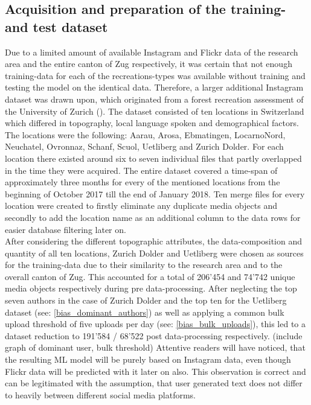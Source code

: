 \subsection{Acquisition and preparation of the training- and test dataset} \label{preparation_training_data}
Due to a limited amount of available Instagram and Flickr data of the research area and the entire canton of Zug respectively, it was certain that not enough training-data for each of the recreations-types was available without training and testing the model on the identical data. Therefore, a larger additional Instagram dataset was drawn upon, which originated from a forest recreation assessment of the University of Zurich (\parencite{forest recreation assessment}). The dataset consisted of ten locations in Switzerland which differed in topography, local language spoken and demographical factors. The locations were the following: Aarau, Arosa, Ebmatingen, LocarnoNord, Neuchatel, Ovronnaz, Schanf, Scuol, Uetliberg and Zurich Dolder. For each location there existed around six to seven individual files that partly overlapped in the time they were acquired. The entire dataset covered a time-span of approximately three months for every of the mentioned locations from the beginning of October 2017 till the end of January 2018.
Ten merge files for every location were created to firstly eliminate any duplicate media objects and secondly to add the location name as an additional column to the data rows for easier database filtering later on.\\
\newline
After considering the different topographic attributes, the data-composition and quantity of all ten locations, Zurich Dolder and Uetliberg were chosen as sources for the training-data due to their similarity to the research area and to the overall canton of Zug. This accounted for a total of 206'454 and 74'742 unique media objects respectively during pre data-processing. After neglecting the top seven authors in the case of Zurich Dolder and the top ten for the Uetliberg dataset (see: \ref{bias_dominant_authors}) as well as applying a common bulk upload threshold of five uploads per day (see: \ref{bias_bulk_uploads}), this led to a dataset reduction to 191'584 / 68'522 post data-processing respectively. (include graph of dominant user, bulk threshold) Attentive readers will have noticed, that the resulting ML model will be purely based on Instagram data, even though Flickr data will be predicted with it later on also. This observation is correct and can be legitimated with the assumption, that user generated text does not differ to heavily between different social media platforms.\\

